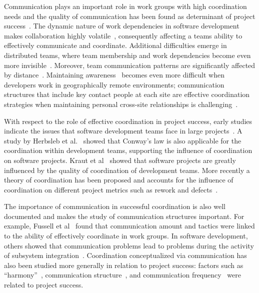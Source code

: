 Communication plays an important role in work groups with high coordination needs
and the quality of communication has been found as determinant of project
success~\cite{curtis:acm:1988,kraut:1995coordination}. The dynamic nature
of work dependencies in software development makes collaboration highly
volatile~\cite{Cataldo:2007hb}, consequently affecting a teams ability to
effectively communicate and coordinate. Additional difficulties emerge in
distributed teams, where team membership and work dependencies become even more
invisible~\cite{damian:icgse:2007}. Moreover, team communication patterns are
significantly affected by distance~\cite{hinds:cscw:2006}. Maintaining
awareness~\cite{sarma:2006icgse} becomes even more difficult when developers work
in geographically remote environments; communication structures that include key
contact people at each site are effective coordination strategies when
maintaining personal cross-site relationships is challenging~\cite{hinds:cscw:2006}.

With respect to the role of effective coordination in project success, early
studies indicate the issues that software development teams face in large
projects~\cite{curtis:acm:1988}. A study by Herbsleb et
al.~\cite{Herbsleb:1999ew} showed that Conway's law is also applicable for the
coordination within development teams, supporting the influence of coordination
on software projects. Kraut et al~\cite{kraut:1995coordination} showed that
software projects are greatly influenced by the quality of coordination of
development teams. More recently a theory of coordination has been proposed and
accounts for the influence of coordination on different project metrics such as
rework and defects~\cite{Herbsleb:2006vn}.

The importance of communication in successful coordination is also well
documented and makes the study of communication structures important. For
example, Fussell et al~\cite{fussell:cscw:1998} found that communication amount and
tactics were linked to the ability of effectively coordinate in work groups. In
software development, others showed that communication problems lead to problems
during the activity of subsystem
integration~\cite{Grinter:1999geography,deSouza2004:thwarts_collaboration}. Coordination
conceptualized via communication has also been studied more generally in relation
to project success: factors such as ``harmony''~\cite{Souder:1988jpim},
communication structure~\cite{Robin:1990jpim}, and communication
frequency~\cite{Griffin:1992ms} were related to project success.

